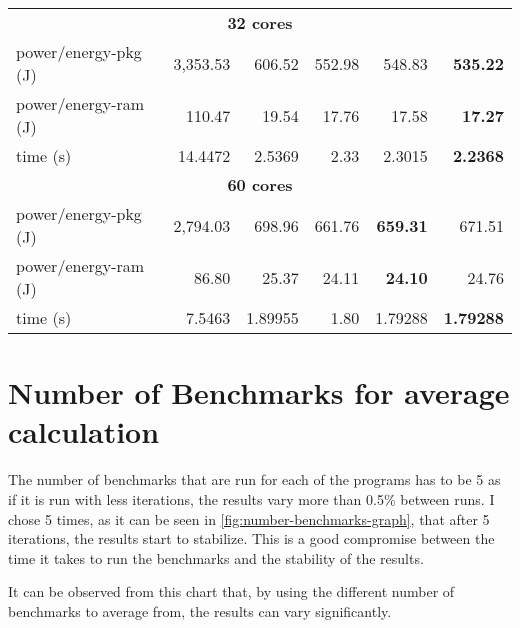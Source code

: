 \begin{table}
\begin{tabular}{lrrrrr}
    \midrule
    \multicolumn{6}{c}{\textbf{32 cores}} \\
    power/energy-pkg (J) & 3,353.53  & 606.52   & 552.98   &     548.83  & \textbf{535.22} \\
    power/energy-ram (J) & 110.47    & 19.54    & 17.76    &     17.58   & \textbf{17.27}  \\
    time (s)             & 14.4472   & 2.5369   & 2.33     &     2.3015  & \textbf{2.2368} \\
    \midrule
    \multicolumn{6}{c}{\textbf{60 cores}} \\
    power/energy-pkg (J) & 2,794.03  & 698.96   & 661.76   & \textbf{659.31} & 671.51         \\
    power/energy-ram (J) & 86.80     & 25.37    & 24.11    & \textbf{24.10}  & 24.76          \\
    time (s)             & 7.5463    & 1.89955  & 1.80     &     1.79288     & \textbf{1.79288}\\
    \bottomrule
  \end{tabular}
\end{table}

\chapter{Number of Benchmarks for average calculation}
\label{chap:appendix-number-benchmarks}

The number of benchmarks that are run for each of the programs has to be 5 as if it is run with less iterations, the results vary more than 0.5\% between runs. I chose 5 times, as it can be seen in \autoref{fig:number-benchmarks-graph}, that after 5 iterations, the results start to stabilize. This is a good compromise between the time it takes to run the benchmarks and the stability of the results.

It can be observed from this chart that, by using the different number of benchmarks to average from, the results can vary significantly.

